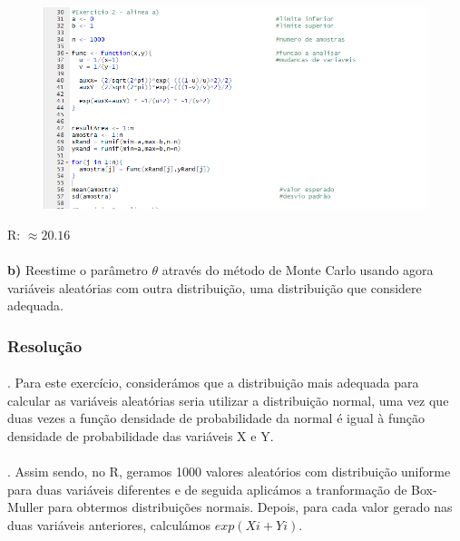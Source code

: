 \documentclass{article}
\begin{document}
					\begin{figure}[!h]
						\includegraphics[scale=0.5]{ex2a)}
					\end{figure}		
					\indent R: $\approx 20.16$

\newpage

			\paragraph{}
			\textbf{b)} Reestime o parâmetro $\theta$ através do método de Monte Carlo usando agora variáveis aleatórias com outra distribuição, uma distribuição que considere adequada.

				\subsubsection*{Resolução}
				\paragraph{}
					. Para este exercício, considerámos que a distribuição mais adequada para calcular as variáveis aleatórias seria utilizar a distribuição normal, uma vez que duas vezes a função densidade de probabilidade da normal é igual à função densidade de probabilidade das variáveis X e Y.
				\paragraph{}
					. Assim sendo, no R, geramos 1000 valores aleatórios com distribuição uniforme para duas variáveis diferentes e de seguida aplicámos a tranformação de Box-Muller para obtermos distribuições normais. Depois, para cada valor gerado nas duas variáveis anteriores, calculámos $exp(Xi+Yi)$.
\end{document}
